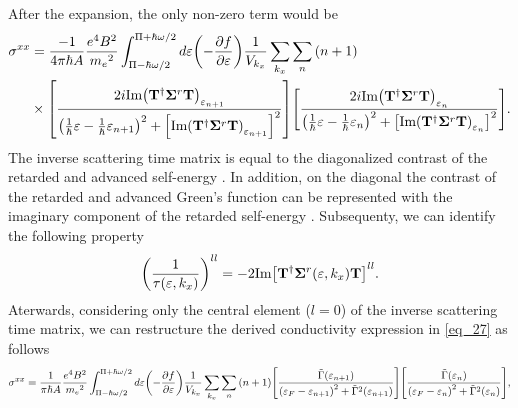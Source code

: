 \begin{widetext}
After the expansion, the only non-zero term would be
\begin{equation} \label{eq_27}
  \begin{aligned}
    {\sigma}^{xx} & =
    \frac{-1}{4\pi\hbar A}
    \frac{e^4B^2}{{{m_e}^2}}
    \int_{\Pi-\hbar\omega/2}^{\Pi+ \hbar\omega/2} d\varepsilon
    \qty(
    -\frac{\partial f}{\partial \varepsilon})
    \frac{1}{V_{k_x}} \sum_{k_x} \sum_{n}
    \qty(n+1)
    \\
    & \times
    \qty[
    \frac{2i \text{Im}\qty(\vb{T}^{\dagger} \vb{\Sigma}^r \vb{T})_{\varepsilon_{n+1}}
    }
    {
    \qty(
    \frac{1}{\hbar}\varepsilon -
    \frac{1}{\hbar}\varepsilon_{n+1}
    )^2
    + \qty[\text{Im}\qty(\vb{T}^{\dagger} \vb{\Sigma}^r \vb{T})_{\varepsilon_{n+1}}]^2
    }]
    \qty[
    \frac{2i \text{Im}\qty(\vb{T}^{\dagger} \vb{\Sigma}^r \vb{T})_{\varepsilon_{n}}
    }
    {
    \qty(
    \frac{1}{\hbar}\varepsilon -
    \frac{1}{\hbar}\varepsilon_{n}
    )^2
    + \qty[\text{Im}\qty(\vb{T}^{\dagger} \vb{\Sigma}^r \vb{T})_{\varepsilon_{n}}]^2
    }].
  \end{aligned}
\end{equation}
The inverse scattering time matrix is equal to the diagonalized contrast of the retarded and advanced self-energy \cite{wackerl20,wackerlthesis20}. In addition, on the diagonal the contrast of the retarded and advanced Green's function can be represented with the imaginary component of the retarded self-energy \cite{wackerl20,wackerlthesis20}. Subsequenty, we can identify the following property
\begin{equation} \label{eq_28}
  \qty(\frac{1}{\tau(\varepsilon,k_x)})^{ll} =
  -2\text{Im}\qty[ \vb{T}^{\dagger} \vb{\Sigma}^r(\varepsilon,k_x) \vb{T}]^{ll}.
\end{equation}
Aterwards, considering only the central element ($l=0$) of the inverse scattering time matrix, we can restructure the derived conductivity expression in \ref{eq_27} as follows
\begin{equation} \label{eq_29}
    {\sigma}^{xx}   =
    \frac{1}{\pi\hbar A}
    \frac{e^4B^2}{{{m_e}^2}}
    \int_{\Pi-\hbar\omega/2}^{\Pi+ \hbar\omega/2} d\varepsilon
    \qty(
    -\frac{\partial f}{\partial \varepsilon})
    \frac{1}{V_{k_x}} \sum_{k_x} \sum_{n}
    \qty(n+1)
    \qty[
    \frac{\tilde{{\Gamma}}(\varepsilon_{n+1})
    }
    {
    \qty(
    \varepsilon_F - \varepsilon_{n+1}
    )^2
    + \tilde{{\Gamma}}^2(\varepsilon_{n+1})
    }]
    \qty[
    \frac{\tilde{{\Gamma}}(\varepsilon_{n})
    }
    {
    \qty(
    \varepsilon_F - \varepsilon_{n}
    )^2
    + \tilde{{\Gamma}}^2(\varepsilon_{n})
    }],
\end{equation}
\end{widetext}
